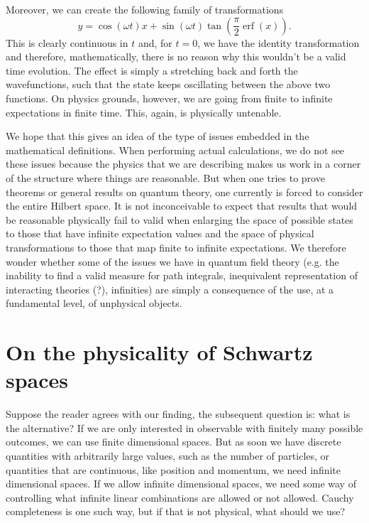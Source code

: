 \documentclass[10pt,twocolumn, nofootinbib]{revtex4-2}
\DeclareMathOperator{\erf}{erf}
\begin{document}
Moreover, we can create the following family of transformations
\begin{equation}
	y = \cos(\omega t) x + \sin(\omega t) \tan \left(\frac{\pi}{2}\erf(x)\right).
\end{equation}
This is clearly continuous in $t$ and, for $t=0$, we have the identity transformation and therefore, mathematically, there is no reason why this wouldn't be a valid time evolution. The effect is simply a stretching back and forth the wavefunctions, such that the state keeps oscillating between the above two functions. On physics grounds, however, we are going from finite to infinite expectations in finite time. This, again, is physically untenable.

We hope that this gives an idea of the type of issues embedded in the mathematical definitions. When performing actual calculations, we do not see these issues because the physics that we are describing makes us work in a corner of the structure where things are reasonable. But when one tries to prove theorems or general results on quantum theory, one currently is forced to consider the entire Hilbert space. It is not inconceivable to expect that results that would be reasonable physically fail to valid when enlarging the space of possible states to those that have infinite expectation values and the space of physical transformations to those that map finite to infinite expectations. We therefore wonder whether some of the issues we have in quantum field theory (e.g. the inability to find a valid measure for path integrals, inequivalent representation of interacting theories (?), infinities) are simply a consequence of the use, at a fundamental level, of unphysical objects.

\section{On the physicality of Schwartz spaces}

Suppose the reader agrees with our finding, the subsequent question is: what is the alternative? If we are only interested in observable with finitely many possible outcomes, we can use finite dimensional spaces. But as soon we have discrete quantities with arbitrarily large values, such as the number of particles, or quantities that are continuous, like position and momentum, we need infinite dimensional spaces. If we allow infinite dimensional spaces, we need some way of controlling what infinite linear combinations are allowed or not allowed. Cauchy completeness is one such way, but if that is not physical, what should we use?
\end{document}
